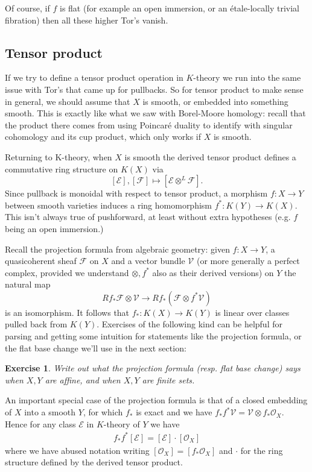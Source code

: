 \documentclass[11pt]{amsart}
\newtheorem{exercise}[dummy]{Exercise}
\theoremstyle{definition}
\newcommand{\Ec}{\mathcal{E}}
\newcommand{\Fc}{\mathcal{F}}
\newcommand{\Oc}{\mathcal{O}}
\newcommand{\Coh}{\mathrm{Coh}}
\numberwithin{equation}{subsection}
\numberwithin{figure}{subsection}
\begin{document}
 Of course, if $f$ is flat (for example an open immersion, or an \'etale-locally trivial fibration) then all these higher Tor's vanish.



 
\subsection{Tensor product} 
 
If we try to define a tensor product operation in $K$-theory we run into the same issue with Tor's that came up for pullbacks. So for tensor product to make sense in general, we should assume that $X$ is smooth, or embedded into something smooth. This is exactly like what we saw with Borel-Moore homology: recall that the product there comes from using Poincar\'e duality to identify with singular cohomology and its cup product, which only works if $X$ is smooth.

Returning to K-theory, when $X$ is smooth the derived tensor product defines a commutative ring structure on $K(X)$ via
$$
[\Ec],[\Fc] \mapsto [\Ec\otimes^L\Fc].
$$ Since pullback is monoidal with respect to tensor product, a morphism $f:X\rightarrow Y$ between smooth varieties induces a ring homomorphism $f^*:K(Y)\rightarrow K(X)$. This isn't always true of pushforward, at least without extra hypotheses (e.g. $f$ being an open immersion.) 

Recall the projection formula from algebraic geometry: given $f:X\rightarrow Y$, a quasicoherent sheaf $\Fc$ on $X$ and a vector bundle $\mathcal{V}$ (or more generally a perfect complex, provided we understand $\otimes,f^*$ also as their derived versions) on $Y$ the natural map 
$$
Rf_*\Fc\otimes \mathcal{V}\rightarrow Rf_*\left(\Fc\otimes f^*\mathcal{V}\right)
$$
is an isomorphism. It follows that $f_*:K(X)\rightarrow K(Y)$ is linear over classes pulled back from $K(Y)$. Exercises of the following kind can be helpful for parsing and getting some intuition for statements like the projection formula, or the flat base change we'll use in the next section:
\begin{exercise}
Write out what the projection formula (resp. flat base change) says when $X,Y$ are affine, and when $X,Y$ are finite sets.
\end{exercise}
An important special case of the projection formula is that of a closed embedding of $X$ into a smooth $Y$, for which $f_*$ is exact and we have $f_*f^*\mathcal{V} = \mathcal{V}\otimes f_*\mathcal{O}_X$. Hence for any class $\Ec$ in $K$-theory of $Y$ we have 
\begin{align}
\label{eq:pushpull-closed}
f_*f^*[\Ec] = [\Ec]\cdot[\Oc_X]
\end{align}
 where we have abused notation writing $[\Oc_X]= [f_*\Oc_X]$ and $\cdot $ for the ring structure defined by the derived tensor product.
\end{document}
